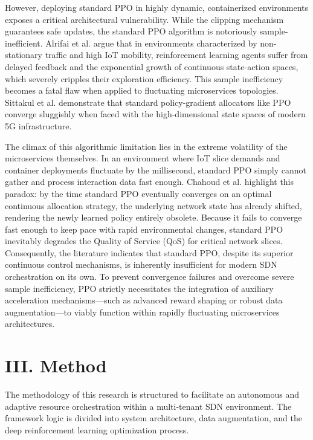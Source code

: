\documentclass[conference]{IEEEtran}
\begin{document}
However, deploying standard PPO in highly dynamic, containerized environments exposes a critical architectural vulnerability. While the clipping mechanism guarantees safe updates, the standard PPO algorithm is notoriously sample-inefficient\cite{b18}. Alrifai et al. argue that in environments characterized by non-stationary traffic and high IoT mobility, reinforcement learning agents suffer from delayed feedback and the exponential growth of continuous state-action spaces, which severely cripples their exploration efficiency\cite{b14}. This sample inefficiency becomes a fatal flaw when applied to fluctuating microservices topologies. Sittakul et al. demonstrate that standard policy-gradient allocators like PPO converge sluggishly when faced with the high-dimensional state spaces of modern 5G infrastructure\cite{b16}.

The climax of this algorithmic limitation lies in the extreme volatility of the microservices themselves. In an environment where IoT slice demands and container deployments fluctuate by the millisecond, standard PPO simply cannot gather and process interaction data fast enough. Chahoud et al. highlight this paradox: by the time standard PPO eventually converges on an optimal continuous allocation strategy, the underlying network state has already shifted, rendering the newly learned policy entirely obsolete\cite{b18}. Because it fails to converge fast enough to keep pace with rapid environmental changes, standard PPO inevitably degrades the Quality of Service (QoS) for critical network slices. Consequently, the literature indicates that standard PPO, despite its superior continuous control mechanisms, is inherently insufficient for modern SDN orchestration on its own. To prevent convergence failures and overcome severe sample inefficiency, PPO strictly necessitates the integration of auxiliary acceleration mechanisms---such as advanced reward shaping or robust data augmentation---to viably function within rapidly fluctuating microservices architectures\cite{b18}.

\section{III. Method}\label{iii.-method}

The methodology of this research is structured to facilitate an autonomous and adaptive resource orchestration within a multi-tenant SDN environment. The framework logic is divided into system architecture, data augmentation, and the deep reinforcement learning optimization process.
\end{document}
